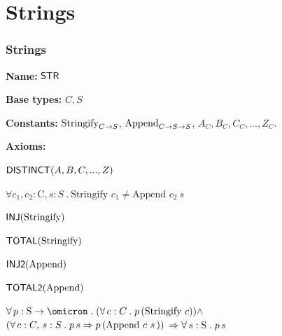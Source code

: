 \documentclass[xcolor={dvipsnames}]{beamer}
\newcommand{\cInjB}[1]{\mName{INJ2}(#1)}
\begin{document}
\section{Strings}
\begin{frame}
\frametitle{Strings}
\begin{thydef}[Strings]
\noindent
\begin{itemize} \setlength{\itemsep}{0pt}\vspace{-0.5cm}
\item<only@1>[]\hspace{-3ex}\textbf{Name:} $\mathsf{STR}$
\item<only@1>[]\hspace{-3ex}\textbf{Base types:} $C, S$
\item<only@1>[]\hspace{-3ex}\textbf{Constants:}\newline
{$\text{Stringify}_{{C} \rightarrow {S}}$, $\text{Append}_{{C} \rightarrow {{S} \rightarrow {S}}}$,
$A_C, B_C, C_C, ... , Z_C$.}
\item<only@2>[]\hspace{-3ex}\textbf{Axioms:}
{\be
\item $\mathsf{DISTINCT}(A,B,C,...,Z)$
\item $\forall c_1, c_2: \text{C}, s: S\ .\ \text{Stringify } c_1 \neq \text{Append } c_2\ s$
\item $\mathsf{INJ}(\text{Stringify})$
\item $\mathsf{TOTAL}(\text{Stringify})$
\item $\cInjB{\text{Append}}$
\item $\mathsf{TOTAL2}(\text{Append})$
\item $\cForallX{p}{\cFunTyX{\text{S}}{\cB}}{\cForall{c}{C}{\cFunAppX{p} {(\text{Stringify}\ c)}}} \land$
$(\forall\, c : C,\, s : S \mathrel{.} p\,s \Rightarrow
p\,(\text{Append}\ c\ s\,))$
$\Rightarrow \forall\, s : \text{S} \mathrel{.} p\,s$
\ee}
\end{itemize}
\end{thydef}
\end{frame}
\end{document}
